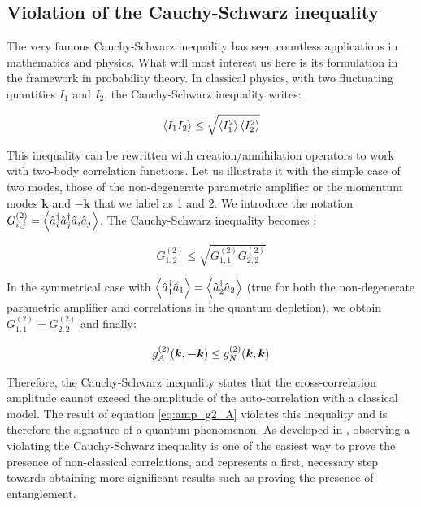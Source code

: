 \subsection{Violation of the Cauchy-Schwarz inequality}

The very famous Cauchy-Schwarz inequality has seen countless applications in mathematics and physics. What will most interest us here is its formulation in the framework in probability theory. In classical physics, with two fluctuating quantities $I_1$ and $I_2$, the Cauchy-Schwarz inequality writes:

\begin{equation}
    \left\langle I_1 I_2\right\rangle \leq \sqrt{\left\langle I_1^2\right\rangle \left\langle I_2^2\right\rangle}
\end{equation}

This inequality can be rewritten with creation/annihilation operators to work with two-body correlation functions. Let us illustrate it with the simple case of two modes, those of the non-degenerate parametric amplifier or the momentum modes $\bm{k}$ and $-\bm{k}$ that we label as 1 and 2. We introduce the notation $G^{(2)}_{i,j} = \left\langle\hat{a}_i^{\dagger} \hat{a}_j^{\dagger} \hat{a}_i \hat{a}_j\right\rangle$. The Cauchy-Schwarz inequality becomes \cite{kheruntsyan2012violation,walls2008}:

\begin{equation}
    G^{(2)}_{1,2} \leq \sqrt{G^{(2)}_{1,1} G^{(2)}_{2,2} }
\end{equation}

In the symmetrical case with $\left\langle\hat{a}^{\dagger}_1 \hat{a}_1\right\rangle=\left\langle\hat{a}^{\dagger}_2 \hat{a}_2\right\rangle$ (true for both the non-degenerate parametric amplifier and \kmk correlations in the quantum depletion), we obtain $G^{(2)}_{1,1}=G^{(2)}_{2,2}$ and finally:

\begin{equation}
    g^{(2)}_A (\bm{k},\bm{-k}) \leq g^{(2)}_N (\bm{k},\bm{k})
\end{equation}

Therefore, the Cauchy-Schwarz inequality states that the cross-correlation amplitude cannot exceed the amplitude of the auto-correlation with a classical model. The result of equation \ref{eq:amp_g2_A} violates this inequality and is therefore the signature of a quantum phenomenon. As developed in \cite{kheruntsyan2012violation}, observing a violating the Cauchy-Schwarz inequality is one of the easiest way to prove the presence of non-classical correlations, and represents a first, necessary step towards obtaining more significant results such as proving the presence of entanglement.

